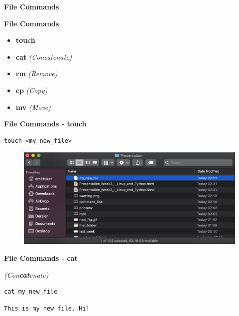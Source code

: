 \documentclass[ignorenonframetext,]{beamer}
\begin{document}
\begin{frame}[fragile]{\textbf{File Commands}}

\begin{block}{\textbf{File Commands}}

\begin{itemize}
\item
  {\textbf{touch}}
\item
  {\textbf{cat}} \emph{(Concatenate)}
\item
  {\textbf{rm}} \emph{(Remove)}
\item
  {\textbf{cp}} \emph{(Copy)}
\item
  {\textbf{mv}} \emph{(Move)}
\end{itemize}

\end{block}

\begin{block}{\textbf{File Commands - {\textbf{touch}}}}

\begin{verbatim}
touch <my_new_file>
\end{verbatim}

\begin{figure}
\centering
\includegraphics{touch.png}
\caption{}
\end{figure}

\end{block}

\begin{block}{\textbf{File Commands - {\textbf{cat}}}}

\emph{(Con\textbf{cat}enate)}

\begin{verbatim}
cat my_new_file
\end{verbatim}

\begin{verbatim}
This is my new file. Hi!
\end{verbatim}


\end{block}
\end{frame}
\end{document}
